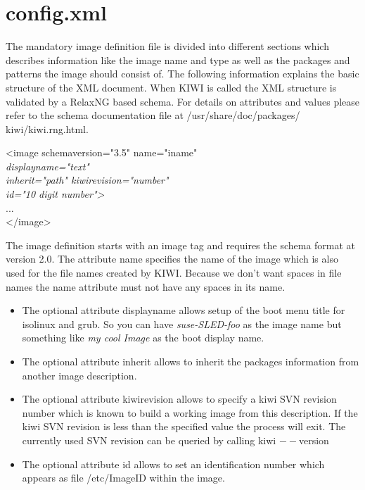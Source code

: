 \section{config.xml}
The mandatory image definition file is divided into different sections
which describes information like the image name and type as well as
the packages and patterns the image should consist of. The following
information explains the basic structure of the XML document. When KIWI
is called the XML structure is validated by a RelaxNG based schema.
For details on attributes and values please refer to the schema 
documentation file at /usr/share/doc/packages/ kiwi/kiwi.rng.html.

\begin{Command}{12cm}
<image schemaversion="3.5" name="iname"\\
\hspace*{1.9cm}\textit{displayname="text"}\\
\hspace*{1.9cm}\textit{inherit="path" kiwirevision="number"}\\
\hspace*{1.9cm}\textit{id="10 digit number">}\\
\hspace*{1cm}...\\
</image>
\end{Command}

The image definition starts with an image tag and requires the
schema format at version 2.0. The attribute name specifies the
name of the image which is also used for the file names created
by KIWI. Because we don't want spaces in file names the name
attribute must not have any spaces in its name.

\begin{itemize}
\item The optional attribute displayname allows setup of the boot
      menu title for isolinux and grub. So you can have
      \textit{suse-SLED-foo} as the image name but something like
      \textit{my cool Image} as the boot display name.
\item The optional attribute inherit allows to inherit the
      packages information from another image description.
\item The optional attribute kiwirevision allows to specify
      a kiwi SVN revision number which is known to build
      a working image from this description. If the kiwi SVN
      revision is less than the specified value the
      process will exit. The currently used SVN revision can
      be queried by calling kiwi $--$version
\item The optional attribute id allows to set an identification
      number which appears as file /etc/ImageID within the
      image.
\end{itemize}

